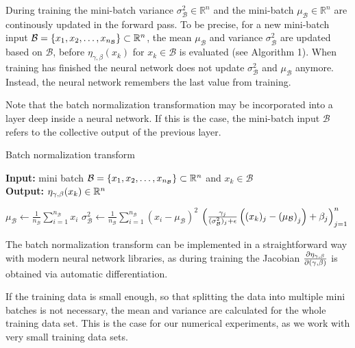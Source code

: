 \documentclass[twoside,a4paper]{article}
\begin{document}
During training the mini-batch variance $\sigma^2_\mathcal{B} \in \mathbb{R}^{n}$ and
the mini-batch $\mu_\mathcal{B} \in \mathbb{R}^{n}$ are continously updated in the forward pass.
To be precise, for a new mini-batch input
$\mathcal{B} = \{ x_1, x_2, \dots, x_{n_{\mathcal{B}}} \} \subset \mathbb{R}^n$, 
the mean $\mu_\mathcal{B}$ and variance $\sigma^2_\mathcal{B}$
are updated based on $\mathcal{B}$, before $\eta_{\gamma, \beta}(x_k)$ for
$x_k \in \mathcal{B}$ is evaluated (see Algorithm 1).
When training has finished the neural network does not update $\sigma_\mathcal{B}^2$ 
and $\mu_\mathcal{B}$ anymore. Instead, the neural network remembers the last value from training.

Note that the batch normalization transformation may be incorporated into a layer
deep inside a neural network. If this is the case, the mini-batch input $\mathcal{B}$ 
refers to the collective output of the previous layer.

\begin{algorithm}\label{algo_batch_norm}
	\caption{Batch normalization transform}
	\textbf{Input:} mini batch $\mathcal{B} = \{x_1, x_2, \dots, x_{n_\mathcal{B}}\} \subset \mathbb{R}^n$ 
	and $x_k \in \mathcal{B}$ \\
	\textbf{Output:} $\eta_{\gamma, \beta}(x_k) \in \mathbb{R}^n$
	\begin{algorithmic}
		 
			\State $\mu_\mathcal{B} \gets \frac{1}{n_\mathcal{B}} \sum_{i=1}^{n_\mathcal{B}} x_i$
			\State $\sigma^2_\mathcal{B} \gets \frac{1}{n_\mathcal{B}} \sum_{i=1}^{n_\mathcal{B}} 
			(x_i - \mu_\mathcal{B})^2$
		\EndIf
		\State \Return 
		$\left( \frac{\gamma_j}{(\sigma^2_\mathcal{B})_j + \epsilon} 
		\left( (x_k)_j - \left( \mu_\mathcal{B} \right)_j \right) + \beta_j \right)_{j=1}^n$
	\end{algorithmic}
\end{algorithm}

The batch normalization transform can be implemented in a straightforward way with modern
neural network libraries, as during training the Jacobian $\frac{\partial \eta_{\gamma, \beta}}{\partial (\gamma, \beta)}$ 
is obtained via automatic differentiation.

If the training data is small enough, so that splitting the data into multiple mini batches
is not necessary, the mean and variance are calculated for the whole training data set. This is the
case for our numerical experiments, as we work with very small training data sets.
\end{document}
